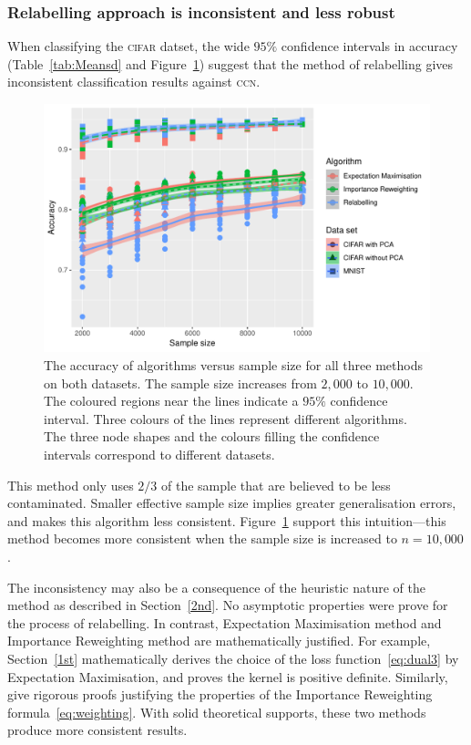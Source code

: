 \documentclass[12pt]{article} %
\begin{document}
\subsubsection{Relabelling approach is inconsistent and less robust}
When classifying the \textsc{cifar} datset, the wide $95\%$ confidence intervals in accuracy (Table~\ref{tab:Meansd} and Figure~\ref{fig:acc}) suggest that the method of relabelling gives inconsistent classification results against \textsc{ccn}. 
\begin{figure}
	\centering
    \includegraphics[scale=.8]{accuracy}%
	\caption{The accuracy of algorithms versus sample size for all three methods on both datasets. The sample size increases from $2,000$ to $10,000$. The coloured regions near the lines indicate a $95\%$ confidence interval. Three colours of the lines represent different algorithms. The three node shapes and the colours filling the confidence intervals correspond to different datasets. 
}
	\label{fig:acc}
\end{figure}
This method only uses $2/3$ of the sample that are believed to be less contaminated. Smaller effective sample size implies greater generalisation errors, and makes this algorithm less consistent. 
Figure~\ref{fig:acc} support this intuition---this method becomes more consistent when the sample size is increased to $n=10,000$.

The inconsistency may also be a consequence of the heuristic nature of the method as described in Section~\ref{2nd}. No asymptotic properties were prove for the process of relabelling. In contrast, Expectation Maximisation method and Importance Reweighting method are mathematically justified. For example, Section~\ref{1st} mathematically derives the choice of the loss function~\eqref{eq:dual3} by Expectation Maximisation, and proves the kernel is positive definite. 
Similarly, \citet{liu2016classification} give rigorous proofs justifying the properties of the Importance Reweighting formula~\eqref{eq:weighting}. With solid theoretical supports, these two methods produce more consistent results.
\end{document}
